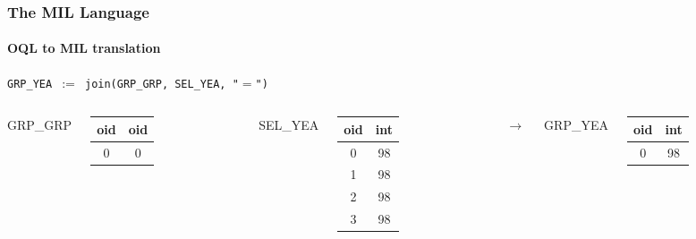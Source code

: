 \documentclass{beamer}
\begin{document}
\begin{frame}
  \frametitle{The MIL Language}
  \framesubtitle{OQL to MIL translation}

  \begin{block}{}
  {\tt GRP\_YEA $:=$ join(GRP\_GRP, SEL\_YEA, "$=$")}
  \end{block}

  \begin{columns}

  \column{2cm}

  GRP\_GRP
  \begin{tabular}{|c|c|}
    \hline
    oid & oid \\
    \hline
    0 & 0 \\
    \hline
  \end{tabular}

  \column{1.5cm}

  SEL\_YEA
  \begin{tabular}{|c|c|}
    \hline
    oid & int \\
    \hline
    0 & 98 \\
    1 & 98 \\
    2 & 98 \\
    3 & 98 \\
    \hline
  \end{tabular}

  \column{0.5cm}

  $\longrightarrow$

  \column{1cm}

  GRP\_YEA
  \begin{tabular}{|c|c|}
    \hline
    oid & int \\
    \hline
    0 & 98 \\
    \hline
  \end{tabular}

  \end{columns}

\end{frame}
\end{document}
